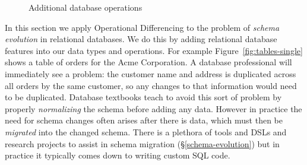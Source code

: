 \documentclass[english,submission]{programming}
\theoremstyle{definition}
\newcommand{\citet}[1]{\citeauthor*{#1}~\cite{#1}}
\begin{document}
\begin{figure}
  \caption{Additional database operations}
  \label{fig:db-operations}
\end{figure}

In this section we apply Operational Differencing to the problem of \textit{schema evolution} in relational databases. We do this by adding relational database features into our data types and operations.
For example Figure~\ref{fig:tables-single} shows a table of orders for the Acme Corporation. A database professional will immediately see a problem: the customer name and address is duplicated across all orders by the same customer, so any changes to that information would need to be duplicated.
Database textbooks teach to avoid this sort of problem by properly \textit{normalizing} the schema before adding any data. However in practice the need for schema changes often arises after there is data, which must then be \textit{migrated} into the changed schema. There is a plethora of tools and DSLs and research projects to assist in schema migration (\S\ref{schema-evolution})
but in practice it typically comes down to writing custom SQL code.
\end{document}
